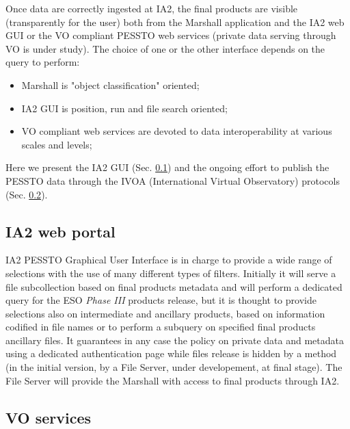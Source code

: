 Once data are correctly ingested at IA2, the final products are visible (transparently for the user) both from the Marshall application and the IA2 web GUI or the VO compliant PESSTO web services (private data serving through VO is under study). The choice of one or the other interface depends on the query to perform:
\begin{itemize}[noitemsep,nolistsep]
	\item Marshall is "object classification" oriented;
	\item IA2 GUI is position, run and file search oriented;
	\item VO compliant web services are devoted to data interoperability at various scales and levels;
\end{itemize} 
Here we present the IA2 GUI (Sec. \ref{ia2web}) and the ongoing effort to publish the PESSTO data through the IVOA (International Virtual Observatory) protocols (Sec. \ref{vo}).

\subsection{IA2 web portal}\label{ia2web}

IA2 PESSTO Graphical User Interface is in charge to provide a wide range of selections with the use of many different types of filters. Initially it will serve a file subcollection based on final products metadata and will perform a dedicated query for the ESO \textit{Phase III} products release, but it is thought to provide selections also on intermediate and ancillary products, based on information codified in file names or to perform a subquery on specified final products ancillary files. 
It guarantees in any case the policy on private data and metadata using a dedicated authentication page while files release is hidden by a method (in the initial version, by a File Server, under developement, at final stage). The File Server will provide the Marshall with access to final products through IA2.
\subsection{VO services}\label{vo}

